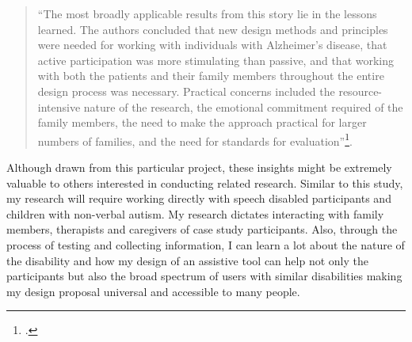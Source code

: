 \begin{quote}
    ``The most broadly applicable results from this story lie in the lessons learned. The authors concluded that new design methods and principles were needed for working with individuals with Alzheimer's disease, that active participation was more stimulating than passive, and that working with both the patients and their family members throughout the entire design process was necessary. Practical concerns included the resource-intensive nature of the research, the emotional commitment required of the family members, the need to make the approach practical for larger numbers of families, and the need for standards for evaluation''\footcite{Cohene2007}.
\end{quote}

Although drawn from this particular project, these insights might be extremely valuable to others interested in conducting related research.
Similar to this study, my research will require working directly with speech disabled participants and children with non-verbal autism.  My research dictates interacting with family members, therapists and caregivers of case study participants.  Also, through the process of testing and collecting information, I can learn a lot about the nature of the disability and how my design of an assistive tool can help not only the participants but also the broad spectrum of users with similar disabilities making my design proposal universal and accessible to many people.


